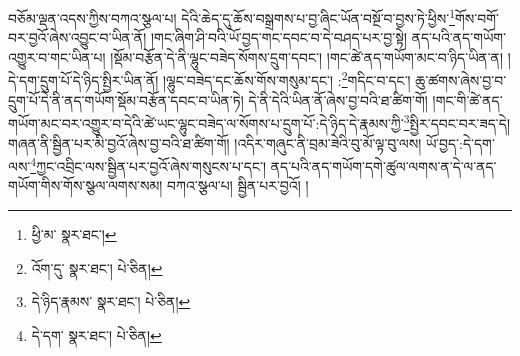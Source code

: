 བཅོམ་ལྡན་འདས་ཀྱིས་བཀའ་སྩལ་པ། དེའི་ཆེད་དུ་ཆོས་བསྒྲགས་པ་བྱ་ཞིང་ཡོན་བསྔོ་བ་བྱས་ཏེ་ཕྱིས་\footnote{ཕྱི་མ་  སྣར་ཐང་། }གོས་བགོ་བར་བྱའོ་ཞེས་འབྱུང་བ་ཡིན་ནོ། །གང་ཞིག་ཤི་བའི་ཡོ་བྱད་གང་དབང་བ་དེ་བཤད་པར་བྱ་སྟེ། ནད་པའི་ནད་གཡོག་འགྱུར་བ་གང་ཡིན་པ། །སྡོམ་བརྩོན་དེ་ནི་ལྷུང་བཟེད་སོགས་དྲུག་དབང་། །གང་ཚེ་ནད་གཡོག་མང་བ་ཉིད་ཡིན་ན། །དེ་དག་དྲུག་པོ་དེ་ཉིད་སྤྱིར་ཡིན་ནོ། །ལྷུང་བཟེད་དང་ཆོས་གོས་གསུམ་དང་། :\footnote{འོག་དུ་  སྣར་ཐང་།  པེ་ཅིན། }གདིང་བ་དང་། ཆུ་ཚགས་ཞེས་བྱ་བ་དྲུག་པོ་དེ་ནི་ནད་གཡོག་སྡོམ་བརྩོན་དབང་བ་ཡིན་ཏེ། དེ་ནི་དེའི་ཡིན་ནོ་ཞེས་བྱ་བའི་ཐ་ཚིག་གོ། །གང་གི་ཚེ་ནད་གཡོག་མང་བར་འགྱུར་བ་དེའི་ཚེ་ཡང་ལྷུང་བཟེད་ལ་སོགས་པ་དྲུག་པོ་:དེ་ཉིད་དེ་རྣམས་ཀྱི་\footnote{དེ་ཉིད་རྣམས་  སྣར་ཐང་།  པེ་ཅིན། }སྤྱིར་དབང་བར་ཟད་དེ། གཞན་ནི་སྦྱིན་པར་མི་བྱའོ་ཞེས་བྱ་བའི་ཐ་ཚིག་གོ། །འདིར་གཞུང་ནི་བྲམ་ཟེའི་བུ་མོ་ལྟ་བུ་ལས། ཡོ་བྱད་:དེ་དག་ལས་\footnote{དེ་དག་  སྣར་ཐང་།  པེ་ཅིན། }ཀྱང་འབྲིང་ལས་སྦྱིན་པར་བྱའོ་ཞེས་གསུངས་པ་དང་། ནད་པའི་ནད་གཡོག་དགེ་ཚུལ་ལགས་ན་དེ་ལ་ནད་གཡོག་གིས་གོས་སྩལ་ལགས་སམ། བཀའ་སྩལ་པ། སྦྱིན་པར་བྱའོ། །
